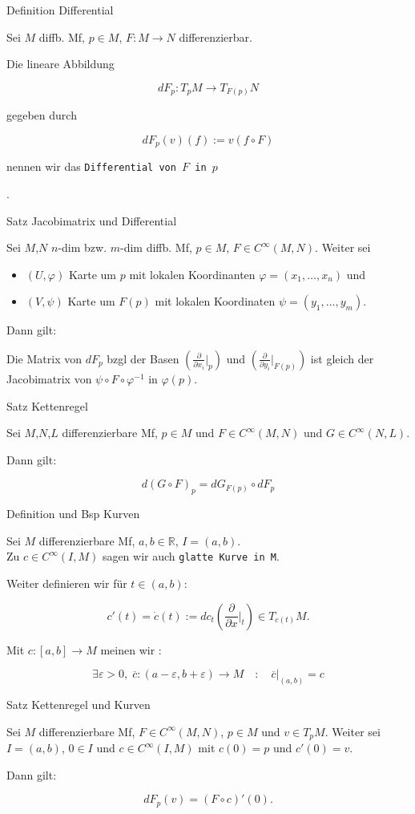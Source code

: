 \documentclass[a6paper,11pt,grid=front]{kartei}
\newcommand{\fl}[1]{\begin{flushleft}
 #1 \end{flushleft}}
\newcommand{\R}{\mathbb{R}}
\newcommand{\eps}{\varepsilon}
\newcounter{def}
\begin{document}
\nonameyet
{Definition} {Differential}
{
Sei $M$ diffb. Mf, $p\in M$, $F : M \to N$ differenzierbar.
\fl{Die lineare Abbildung}
\[
dF_p : T_pM \to T_{F(p)}N 
\] 
\fl{gegeben durch}
\[
dF_p(v)(f) := v(f\circ F)
\]
\fl{nennen wir das \texttt{Differential von $F$ in $p$}}.
}
{}

\nonameyet
{Satz} {\tiny Jacobimatrix und Differential}
{
\small
Sei $M$,$N$ $n$-dim bzw. $m$-dim diffb. Mf, $p\in M$, $F \in C^\infty(M,N)$. 
Weiter sei \begin{itemize}[-]
\item $(U,\varphi)$ Karte um $p$ mit lokalen Koordinanten 
$\varphi = (x_1,\dots,x_n)$ und  
\item $(V,\psi)$ Karte um $F(p)$ mit 
lokalen Koordinaten $\psi = (y_1,\dots,y_m)$.
\end{itemize}
\fl{Dann gilt:}
Die Matrix von $dF_p$ bzgl der Basen 
$(\frac{\partial}{\partial x_i}\big|_{p})$ und 
$(\frac{\partial}{\partial y_i}\big|_{F(p)})$ ist gleich der Jacobimatrix von
$\psi \circ F \circ \varphi^ {-1}$ in $\varphi(p)$.
}
{}

\nonameyet
{Satz} {Kettenregel}
{
Sei $M$,$N$,$L$ differenzierbare Mf, $p\in M$ und $F\in C^\infty(M,N)$ und $G\in C^\infty(N,L)$.
\fl{Dann gilt:}
\[
d(G\circ F)_p = dG_{F(p)}\circ dF_p 
\]
}
{}


\nonameyet
{Definition und Bsp} {Kurven}
{
Sei $M$ differenzierbare Mf, $a,b \in \R$, $I = (a,b)$.
\\
Zu $c\in C^\infty(I, M)$ sagen wir auch \texttt{glatte Kurve in M}.
\fl{Weiter definieren wir für $t\in (a,b)$:}
\[
c'(t) = \dot c(t) := dc_t(\frac{\partial}{\partial x}\bigg|_t)
\in T_{c(t)} M.
\]
\fl{Mit $c: [a,b] \to M$ meinen wir :}
\[
\exists \eps > 0,\; \overline c :(a - \eps, b + \eps) \to M
\quad : \quad  \overline c |_{(a,b)} = c
\]
}
{}

\nonameyet
{Satz} {Kettenregel und Kurven}
{
Sei $M$ differenzierbare Mf, $F\in C^\infty(M,N)$, $p\in M$ und $v\in T_pM$.
Weiter sei $I = (a,b)$, $0\in I$ und $c \in C^\infty(I,M)$ mit $c(0) = p$ 
und $c'(0) = v$.
\fl{Dann gilt:}
\[
dF_p(v) = (F \circ c)' (0).
\]
}
{}
\end{document}

